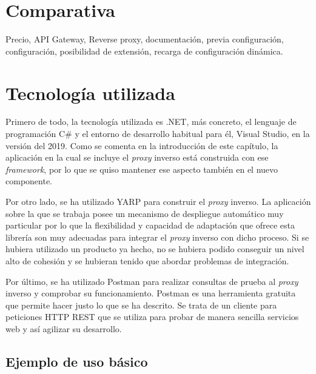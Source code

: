 \documentclass[11pt,spanish,listoffigures]{tfgetsinf}
\begin{document}

\section{Comparativa}

Precio, API Gateway, Reverse proxy, documentación, previa configuración, configuración, posibilidad de extensión, recarga de configuración dinámica.


\section{Tecnología utilizada}

Primero de todo, la tecnología utilizada es .NET, más concreto, el lenguaje de programación C\# y el entorno de desarrollo habitual para él, Visual Studio, en la versión del 2019. Como se comenta en la introducción de este capítulo, la aplicación en la cual se incluye el \emph{proxy} inverso está construida con ese \emph{framework}, por lo que se quiso mantener ese aspecto también en el nuevo componente.

Por otro lado, se ha utilizado YARP para construir el \emph{proxy} inverso. La aplicación sobre la que se trabaja posee un mecanismo de despliegue automático muy 
particular por lo que la flexibilidad y capacidad de adaptación que ofrece esta librería son muy adecuadas para integrar el \emph{proxy} inverso con dicho proceso. Si se hubiera utilizado un producto ya hecho, no se hubiera podido conseguir un nivel alto de cohesión y se hubieran tenido que abordar problemas de integración.

Por último, se ha utilizado Postman \cite{Postman} para realizar consultas de prueba al \emph{proxy} inverso y comprobar su funcionamiento. Postman es una herramienta gratuita que permite hacer justo lo que se ha descrito. Se trata de un cliente para peticiones HTTP REST que se utiliza para probar de manera sencilla servicios web y así agilizar su desarrollo.


\subsection{Ejemplo de uso básico}
\end{document}
